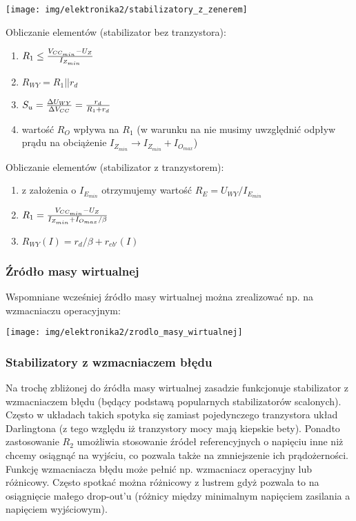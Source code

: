 \documentclass{pdfBooklets}
\begin{document}
\begin{center}\texttt{[image: img/elektronika2/stabilizatory\_z\_zenerem]}\end{center}

Obliczanie elementów (stabilizator bez tranzystora):
\begin{enumerate}
	\item $R_1 \le {V_{CC_{min}} - U_{Z} \over I_{Z_{min}}}$
	\item $R_{WY} = R_1 || r_{d}$
	\item $S_u = {\Delta U_{WY} \over \Delta V_{CC}} = {r_{d} \over R_1 + r_{d}}$
	\item wartość $R_O$ wpływa na $R_1$ (w warunku na nie musimy uwzględnić odpływ prądu na obciążenie $I_{Z_{min}} \rightarrow I_{Z_{min}} + I_{O_{max}}$)
\end{enumerate}

Obliczanie elementów (stabilizator z tranzystorem):
\begin{enumerate}
	\item z założenia o $I_{E_{min}}$ otrzymujemy wartość $R_E = U_{WY}/I_{E_{min}}$
	\item $R_1 = {V_{CC_{min}} - U_{Z} \over I_{Z_{min}} + I_{O_{max}}/\beta}$
	\item $R_{WY}(I) = r_{d} / \beta + r_{eb'}(I)$
\end{enumerate}

\subsubsection{Źródło masy wirtualnej}
Wspomniane wcześniej źródło masy wirtualnej można zrealizować np. na wzmacniaczu operacyjnym:

\begin{center}\texttt{[image: img/elektronika2/zrodlo\_masy\_wirtualnej]}\end{center}

\subsubsection{Stabilizatory z wzmacniaczem błędu}
Na trochę zbliżonej do źródła masy wirtualnej zasadzie funkcjonuje stabilizator z wzmacniaczem błędu (będący podstawą popularnych stabilizatorów scalonych).
Często w układach takich spotyka się zamiast pojedynczego tranzystora układ Darlingtona (z tego względu iż tranzystory mocy mają kiepskie bety).
Ponadto zastosowanie $R_2$ umożliwia stosowanie źródeł referencyjnych o napięciu inne niż chcemy osiągnąć na wyjściu, co pozwala także na zmniejszenie ich prądożerności.
Funkcję wzmacniacza błędu może pełnić np. wzmacniacz operacyjny lub różnicowy.
Często spotkać można różnicowy z lustrem gdyż pozwala to na osiągnięcie małego drop-out'u (różnicy między minimalnym napięciem zasilania a napięciem wyjściowym).
\end{document}
